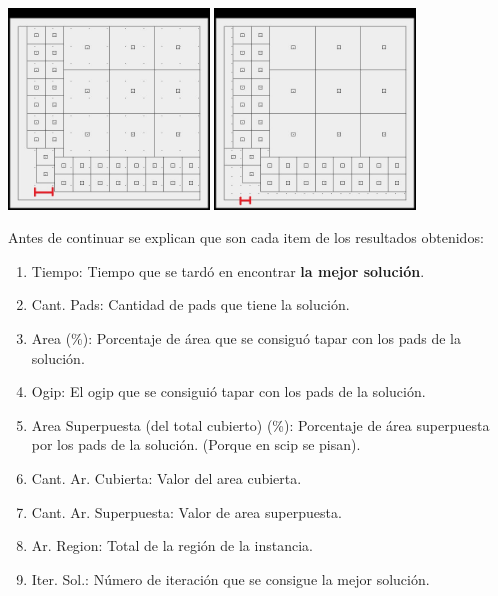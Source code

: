 \begin{enumerate}
\begin{center}
\includegraphics[width=0.4\textwidth]{imagenes/iter40}
\includegraphics[width=0.4\textwidth]{imagenes/iter45}
\end{center}

\end{enumerate}


Antes de continuar se explican que son cada item de los resultados obtenidos:

\begin{enumerate}
\item Tiempo: Tiempo que se tard\'o en encontrar \textbf{la mejor soluci\'on}.
\item Cant. Pads: Cantidad de pads que tiene la soluci\'on.
\item Area (\%): Porcentaje de \'area que se consigu\'o tapar con los pads de la soluci\'on.
\item Ogip: El ogip que se consigui\'o tapar con los pads de la soluci\'on.
\item Area Superpuesta (del total cubierto) (\%): Porcentaje de \'area superpuesta por los pads de la soluci\'on. (Porque en scip se pisan).
\item Cant. Ar. Cubierta: Valor del area cubierta.
\item Cant. Ar. Superpuesta: Valor de area superpuesta.
\item Ar. Region: Total de la regi\'on de la instancia.
\item Iter. Sol.: N\'umero de iteraci\'on que se consigue la mejor soluci\'on.

\end{enumerate}

